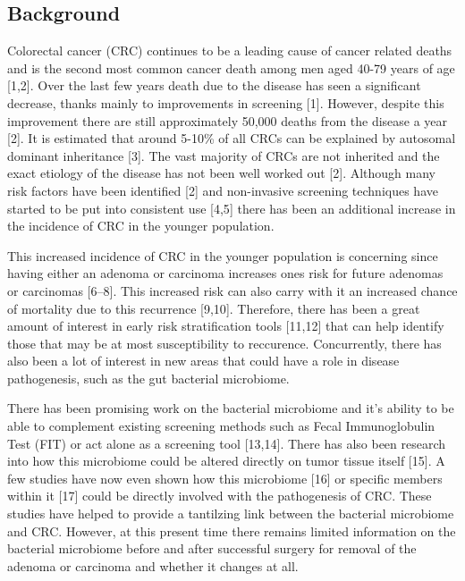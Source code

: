 \documentclass[12pt,]{article}
\begin{document}
\newpage

\subsection{Background}\label{background}

Colorectal cancer (CRC) continues to be a leading cause of cancer
related deaths and is the second most common cancer death among men aged
40-79 years of age {[}1,2{]}. Over the last few years death due to the
disease has seen a significant decrease, thanks mainly to improvements
in screening {[}1{]}. However, despite this improvement there are still
approximately 50,000 deaths from the disease a year {[}2{]}. It is
estimated that around 5-10\% of all CRCs can be explained by autosomal
dominant inheritance {[}3{]}. The vast majority of CRCs are not
inherited and the exact etiology of the disease has not been well worked
out {[}2{]}. Although many risk factors have been identified {[}2{]} and
non-invasive screening techniques have started to be put into consistent
use {[}4,5{]} there has been an additional increase in the incidence of
CRC in the younger population.

This increased incidence of CRC in the younger population is concerning
since having either an adenoma or carcinoma increases ones risk for
future adenomas or carcinomas {[}6--8{]}. This increased risk can also
carry with it an increased chance of mortality due to this recurrence
{[}9,10{]}. Therefore, there has been a great amount of interest in
early risk stratification tools {[}11,12{]} that can help identify those
that may be at most susceptibility to reccurence. Concurrently, there
has also been a lot of interest in new areas that could have a role in
disease pathogenesis, such as the gut bacterial microbiome.

There has been promising work on the bacterial microbiome and it's
ability to be able to complement existing screening methods such as
Fecal Immunoglobulin Test (FIT) or act alone as a screening tool
{[}13,14{]}. There has also been research into how this microbiome could
be altered directly on tumor tissue itself {[}15{]}. A few studies have
now even shown how this microbiome {[}16{]} or specific members within
it {[}17{]} could be directly involved with the pathogenesis of CRC.
These studies have helped to provide a tantilzing link between the
bacterial microbiome and CRC. However, at this present time there
remains limited information on the bacterial microbiome before and after
successful surgery for removal of the adenoma or carcinoma and whether
it changes at all.
\end{document}
